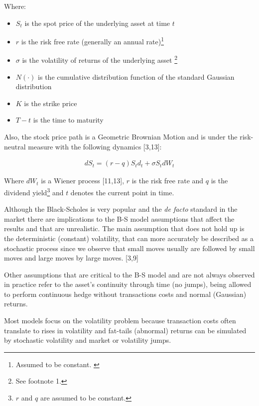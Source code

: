 \documentclass[12pt,twoside]{reedthesis}
\providecommand{\tightlist}{%
  \setlength{\itemsep}{0pt}\setlength{\parskip}{0pt}}
\theoremstyle{definition}
\theoremstyle{definition}
\theoremstyle{remark}
\begin{document}
  \noindent
  Where:
  
  \begin{itemize}
  \tightlist
  \item
    \(S_{t}\) is the spot price of the underlying asset at time \(t\)
  \item
    \(r\) is the risk free rate (generally an annual
    rate)\footnote{Assumed to be constant. \label{teste}}
  \item
    \(\sigma\) is the volatility of returns of the underlying asset
    \footnote{See footnote 1.}
  \item
    \(N(\cdot )\) is the cumulative distribution function of the standard
    Gaussian distribution
  \item
    \(K\) is the strike price
  \item
    \(T-t\) is the time to maturity
  \end{itemize}
  
  \noindent
  Also, the stock price path is a Geometric Brownian Motion and is under
  the risk-neutral measure with the following dynamics {[}3,13{]}:
  
  \begin{align}
  dS_{t} = (r-q)S_td_t+\sigma S_t dW_t
  \end{align}
  
  \noindent
  Where \(dW_t\) is a Wiener process {[}11,13{]}, \(r\) is the risk free
  rate and \(q\) is the dividend
  yield\footnote{$r$ and $q$ are assumed to be constant.} and \(t\)
  denotes the current point in time.
  
  Although the Black-Scholes is very popular and the \emph{de facto}
  standard in the market there are implications to the B-S model
  assumptions that affect the results and that are unrealistic. The main
  assumption that does not hold up is the deterministic (constant)
  volatility, that can more accurately be described as a stochastic
  process since we observe that small moves usually are followed by small
  moves and large moves by large moves. {[}3,9{]}
  
  Other assumptions that are critical to the B-S model and are not always
  observed in practice refer to the asset's continuity through time (no
  jumps), being allowed to perform continuous hedge without transactions
  costs and normal (Gaussian) returns.
  
  Most models focus on the volatility problem because transaction costs
  often translate to rises in volatility and fat-tails (abnormal) returns
  can be simulated by stochastic volatility and market or volatility
  jumps.
  
\end{document}
